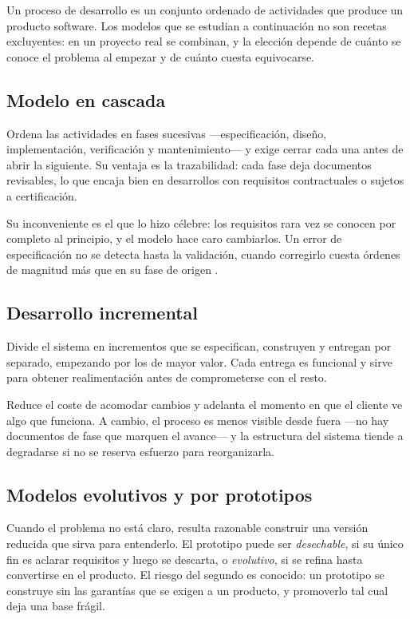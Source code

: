 Un proceso de desarrollo es un conjunto ordenado de actividades que produce un
producto software. Los modelos que se estudian a continuación no son recetas
excluyentes: en un proyecto real se combinan, y la elección depende de cuánto se
conoce el problema al empezar y de cuánto cuesta equivocarse.

\subsection*{Modelo en cascada}

Ordena las actividades en fases sucesivas —especificación, diseño,
implementación, verificación y mantenimiento— y exige cerrar cada una antes de
abrir la siguiente. Su ventaja es la trazabilidad: cada fase deja documentos
revisables, lo que encaja bien en desarrollos con requisitos contractuales o
sujetos a certificación.

Su inconveniente es el que lo hizo célebre: los requisitos rara vez se conocen por
completo al principio, y el modelo hace caro cambiarlos. Un error de
especificación no se detecta hasta la validación, cuando corregirlo cuesta
órdenes de magnitud más que en su fase de origen \cite{pressman2021}.

\subsection*{Desarrollo incremental}

Divide el sistema en incrementos que se especifican, construyen y entregan por
separado, empezando por los de mayor valor. Cada entrega es funcional y sirve para
obtener realimentación antes de comprometerse con el resto.

Reduce el coste de acomodar cambios y adelanta el momento en que el cliente ve
algo que funciona. A cambio, el proceso es menos visible desde fuera —no hay
documentos de fase que marquen el avance— y la estructura del sistema tiende a
degradarse si no se reserva esfuerzo para reorganizarla.

\subsection*{Modelos evolutivos y por prototipos}

Cuando el problema no está claro, resulta razonable construir una versión reducida
que sirva para entenderlo. El prototipo puede ser \emph{desechable}, si su único
fin es aclarar requisitos y luego se descarta, o \emph{evolutivo}, si se refina
hasta convertirse en el producto. El riesgo del segundo es conocido: un prototipo
se construye sin las garantías que se exigen a un producto, y promoverlo tal cual
deja una base frágil.

